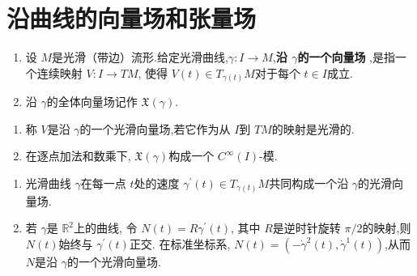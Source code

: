 \documentclass[../../main.tex]{subfiles}
\begin{document}
\section{沿曲线的向量场和张量场}

\begin{definition}
    \begin{enumerate}
        \item 设 \(  M  \)是光滑（带边）流形.给定光滑曲线,\(   \gamma :I\to M  \),\textbf{沿 \(   \gamma   \)的一个向量场 },是指一个连续映射 \(  V: I\to TM  \),
        使得 \(  V\left( t \right) \in T_{ \gamma \left( t \right) }M    \)对于每个 \(  t \in I  \)成立.
        \item     沿 \(   \gamma   \)的全体向量场记作 \(  \mathfrak{X}\left(  \gamma  \right)   \).  
    \end{enumerate}
\end{definition}

\begin{remark}
    \begin{enumerate}
        \item 称 \(  V  \)是沿 \(   \gamma   \)的一个光滑向量场,若它作为从 \(  I  \)到 \(  TM  \)的映射是光滑的.  
        \item 在逐点加法和数乘下, \(  \mathfrak{X}\left(  \gamma  \right)   \)构成一个 \(  C^{\infty}\left( I \right)   \)-模.    
    \end{enumerate}
    
\end{remark}

\begin{example}
    \begin{enumerate}
        \item 光滑曲线 \(   \gamma   \)在每一点 \(  t  \)处的速度 \(   \gamma ^{\prime} \left( t \right) \in T_{ \gamma \left( t \right) }M   \)共同构成一个沿 \(   \gamma   \)的光滑向量场.
        \item 若 \(   \gamma   \)是 \(  \mathbb{R} ^{2}  \)上的曲线, 令 \(  N\left( t \right) =  R \gamma ^{\prime} \left( t \right)    \),   其中 \(  R  \)是逆时针旋转 \(  \pi /2  \)的映射,则 \(  N\left( t \right)   \)始终与 \(   \gamma ^{\prime} \left( t \right)   \)正交.
        在标准坐标系, \(  N\left( t \right) =  \left( - \dot{\gamma}^{2}\left( t \right), \dot{\gamma}^{1}\left( t \right)   \right)    \),从而 \(  N  \)是沿 \(   \gamma   \)的一个光滑向量场.       
    \end{enumerate}
        
\end{example}
\end{document}
